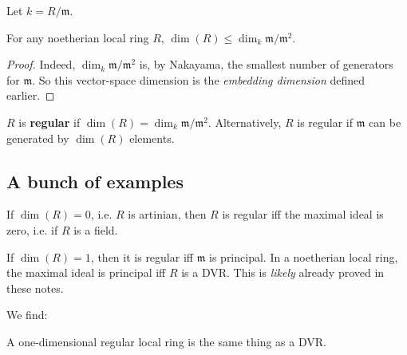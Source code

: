 Let $k = R/\mathfrak{m}$.
\begin{proposition} For any noetherian local ring $R$,
$\dim(R) \leq \dim_{k} \mathfrak{m}/\mathfrak{m}^2$.
\end{proposition} 
\begin{proof} 
Indeed, $\dim_k \mathfrak{m}/\mathfrak{m}^2$ is, by Nakayama, the smallest
number of generators for $\mathfrak{m}$. So this vector-space dimension is the
\emph{embedding dimension} defined earlier.
\end{proof} 

\begin{definition} 
$R$ is \textbf{regular} if $\dim(R) = \dim_k \mathfrak{m}/\mathfrak{m}^2$.
Alternatively, $R$ is regular if $\mathfrak{m}$ can be generated by $\dim(R)$
elements.
\end{definition} 

\subsection{A bunch of examples}
\begin{example} 
If $\dim(R)=0$, i.e. $R$ is artinian, then $R$ is regular iff the maximal ideal
is zero, i.e. if $R$ is a field.
\end{example} 

\begin{example} 
If $\dim(R) =1$, then it is regular iff $\mathfrak{m}$ is principal. In a
noetherian local ring, the maximal ideal is principal iff $R$ is a DVR.
This is \emph{likely} already proved in these notes. 
\end{example} 
We find:
\begin{proposition} 
A one-dimensional regular local ring is the same thing as a DVR.
\end{proposition} 

